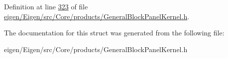 Definition at line \hyperlink{eigen_2_eigen_2src_2_core_2products_2_general_block_panel_kernel_8h_source_l00323}{323} of file \hyperlink{eigen_2_eigen_2src_2_core_2products_2_general_block_panel_kernel_8h_source}{eigen/\+Eigen/src/\+Core/products/\+General\+Block\+Panel\+Kernel.\+h}.



The documentation for this struct was generated from the following file\+:\begin{DoxyCompactItemize}
\item 
eigen/\+Eigen/src/\+Core/products/\+General\+Block\+Panel\+Kernel.\+h\end{DoxyCompactItemize}
